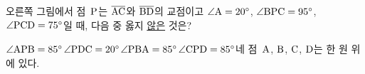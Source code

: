 \noindent\begin{minipage}[t]{0.58\linewidth}\vspace{0pt}\raggedright 오른쪽 그림에서 점~$\mathrm{P}$는 $\overline{\mathrm{AC}}$와 $\overline{\mathrm{BD}}$의 교점이고 $\angle\mathrm{A}=20^\circ$, $\angle\mathrm{BPC}=95^\circ$, $\angle\mathrm{PCD}=75^\circ$일 때, 다음 중 옳지 \underline{않은} 것은?\end{minipage}\hfill\begin{minipage}[t]{0.4\linewidth}\vspace{0pt}\centering \resizebox{\ifdim\width>\linewidth\linewidth\else\width\fi}{!}{}\end{minipage}\par
\begin{choicesv}{$\angle\mathrm{APB}=85^\circ$}{$\angle\mathrm{PDC}=20^\circ$}{$\angle\mathrm{PBA}=85^\circ$}{$\angle\mathrm{CPD}=85^\circ$}{네 점~$\mathrm{A}$, $\mathrm{B}$, $\mathrm{C}$, $\mathrm{D}$는 한 원 위에 있다.}\end{choicesv}
